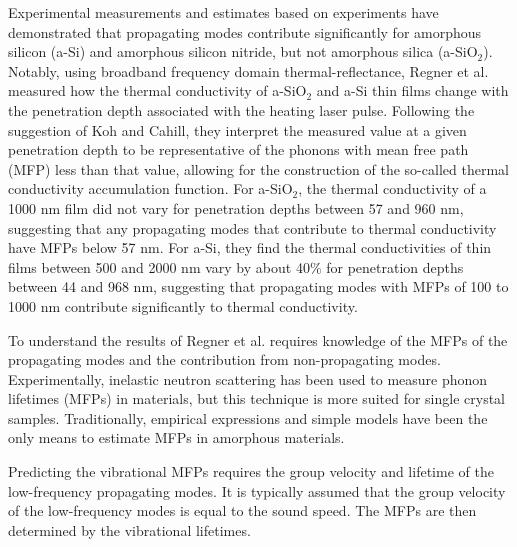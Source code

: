 \documentclass[aps,prb,onecolumn,preprint,superscriptaddress,footinbib,amsmath,amssymb,floatfix]{revtex4}
\begin{document}
Experimental measurements and estimates based on experiments 
have demonstrated that propagating modes contribute significantly 
for amorphous silicon (a-Si) and 
\cite{cahill_thermal_1994,liu_high_2009,yang_anomalously_2010,
regner_broadband_2013}
amorphous silicon nitride,\cite{sultan_heat_2013} 
but not amorphous silica (a-SiO$_2$).
\cite{love_estimate_1990,lee_heat_1997,baldi_thermal_2008,
regner_broadband_2013} 
Notably, using broadband frequency domain thermal-reflectance, 
Regner et al. measured how the thermal conductivity of a-SiO$_2$ and 
a-Si thin films change with the penetration depth associated with the 
heating laser pulse.\cite{regner_broadband_2013} 
Following the suggestion of Koh and Cahill, they interpret the 
measured value at a given penetration depth to be representative 
of the phonons with mean free path (MFP) less than that value, 
allowing for the 
construction of the so-called thermal conductivity accumulation 
function.\cite{dames_thermal_2005,minnich_thermal_2011,
yang_mean_2013} 
For a-SiO$_2$, the thermal conductivity of a 1000 nm 
film did not vary for penetration depths between 57 and 960 nm, 
suggesting that any propagating modes that contribute to thermal 
conductivity have MFPs below 57 nm. For a-Si, they find the 
thermal conductivities of thin films between 500 and 2000 nm 
vary by about 
40$\%$ for penetration depths between 44 and 968 nm, suggesting 
that propagating modes with MFPs of 100 to 1000 nm contribute 
significantly to thermal conductivity.\cite{regner_broadband_2013}  

To understand the results of Regner et al. requires knowledge of 
the MFPs of the 
propagating modes and the contribution from non-propagating modes. 
Experimentally, inelastic neutron scattering has been
used to measure phonon lifetimes (MFPs) in materials,
but this technique is more suited for single crystal samples.
\cite{christianson_phonon_2008} 
Traditionally, empirical expressions and
simple models have been the only means
to estimate MFPs in amorphous materials.
\cite{zeller_thermal_1971,graebner_phonon_1986,
freeman_thermal_1986,cahill_lattice_1988,cahill_heat_1989} 

Predicting the vibrational MFPs 
requires the 
group velocity and lifetime 
of the low-frequency propagating modes.
\cite{freeman_thermal_1986,graebner_phonon_1986,
love_estimate_1990,feldman_thermal_1993,cahill_thermal_1994,
feldman_numerical_1999,baldi_thermal_2008,liu_high_2009,
yang_anomalously_2010} It is typically assumed that 
the group velocity of the low-frequency modes 
is equal to the sound speed.\cite{zeller_thermal_1971,
freeman_thermal_1986,graebner_phonon_1986,cahill_lattice_1988,
cahill_heat_1989,love_estimate_1990,feldman_thermal_1993,
cahill_thermal_1994,feldman_numerical_1999} The MFPs 
are then determined by the vibrational lifetimes.
\end{document}
